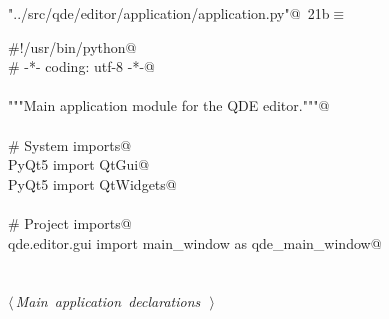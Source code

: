 \documentclass[
    a4paper,      %
    10pt,         %
    openright,    %
    notitlepage,  %
    parskip=half, %
]{scrreprt}       %
\theoremstyle{definition}                    %
\begin{document}
\begin{flushleft} \small
\begin{minipage}{\linewidth}\label{scrap16}\raggedright\small
{} \verb@"../src/qde/editor/application/application.py"@\nobreak\ {\footnotesize {21b}}$\equiv$
\vspace{-1ex}
\begin{list}{}{} \item
\mbox{}\lstinline@#!/usr/bin/python@\\
\mbox{}\lstinline@# -*- coding: utf-8 -*-@\\
\mbox{}\lstinline@@\\
\mbox{}\lstinline@"""Main application module for the QDE editor."""@\\
\mbox{}\lstinline@@\\
\mbox{}\lstinline@# System imports@\\
\mbox{}\lstinline@from PyQt5 import QtGui@\\
\mbox{}\lstinline@from PyQt5 import QtWidgets@\\
\mbox{}\lstinline@@\\
\mbox{}\lstinline@# Project imports@\\
\mbox{}\lstinline@from qde.editor.gui import main_window as qde_main_window@\\
\mbox{}\lstinline@@\\
\mbox{}\lstinline@@\\
\mbox{}\lstinline@@\hbox{$\langle\,${\itshape Main application declarations}\nobreak\ {\footnotesize {}}$\,\rangle$}\lstinline@@\\
\mbox{}\lstinline@@{\NWsep}
\end{list}
\vspace{-1.5ex}
\footnotesize
\begin{list}{}{\setlength{\itemsep}{-\parsep}\setlength{\itemindent}{-\leftmargin}}

\item{}
\end{list}
\end{minipage}\vspace{4ex}
\end{flushleft}
\end{document}
